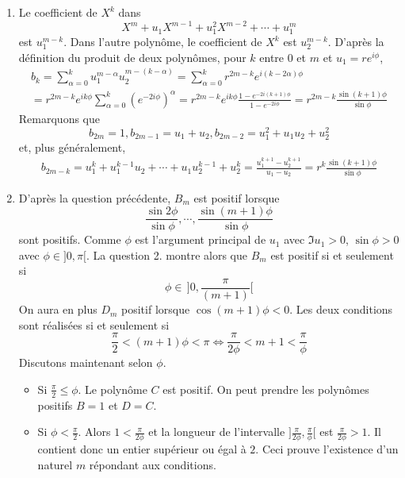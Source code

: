 \begin{enumerate}
\begin{enumerate}
\item Le coefficient de $X^k$ dans
\begin{displaymath}
X^m+u_1X^{m-1}+u_1^2X^{m-2}+\cdots+u_1^m
\end{displaymath}
est $u_1^{m-k}$. Dans l'autre polyn{\^o}me, le coefficient de $X^k$ est $u_2^{m-k}$. D'apr{\`e}s la d{\'e}finition du produit de deux polyn{\^o}mes, pour $k$ entre 0 et $m$ et $u_1=re^{i\phi}$,
\begin{multline*}
b_k = \sum_{\alpha=0}^{k}u_1^{m-\alpha}u_2^{m-(k-\alpha)}
  = \sum_{\alpha=0}^{k}r^{2m-k} e^{i(k-2\alpha)\phi}\\
  = r^{2m-k}e^{ik\phi}\sum_{\alpha=0}^{k}(e^{-2i\phi})^\alpha
  = r^{2m-k}e^{ik\phi}\frac{1-e^{-2i(k+1)\phi}}{1-e^{-2i\phi}}
  = r^{2m-k}\frac{\sin(k+1)\phi}{\sin\phi}
\end{multline*}
Remarquons que
\begin{displaymath}
b_{2m}=1,b_{2m-1}=u_1+u_2,b_{2m-2}=u_1^2+u_1u_2+u_2^2
\end{displaymath}
et, plus g{\'e}n{\'e}ralement,
\begin{multline*}
b_{2m-k} = u_1^k+u_1^{k-1}u_2+ \cdots +u_1u_2^{k-1}+u_2^k = \frac{u_1^{k+1}-u_2^{k+1}}{u_1-u_2} 
         = r^k\frac{\sin(k+1)\phi}{\sin\phi}
\end{multline*}

\item D'apr{\`e}s la question pr{\'e}c{\'e}dente, $B_m$ est positif lorsque
\begin{displaymath}
\frac{\sin2\phi}{\sin \phi},\cdots ,\frac{\sin(m+1)\phi}{\sin \phi} 
\end{displaymath}
sont positifs. Comme $\phi$ est l'argument principal de $u_1$ avec $\Im u_1 >0$, $\sin \phi>0$ avec $\phi\in ]0,\pi[$. La question 2. montre alors que $B_m$ est positif si et seulement si
\begin{displaymath}
\phi \in \, ]0,\frac{\pi}{(m+1)}[
\end{displaymath}
On aura en plus $D_m$ positif lorsque $\cos(m+1)\phi <0$. Les deux conditions sont réalisées si et seulement si
\begin{displaymath}
 \frac{\pi}{2} < (m+1)\phi < \pi \Leftrightarrow \frac{\pi}{2\phi} < m+1 < \frac{\pi}{\phi}  
\end{displaymath}
Discutons maintenant selon $\phi$.
\begin{itemize}
 \item Si $\frac{\pi}{2} \leq \phi$. Le polynôme $C$ est positif. On peut prendre les polynômes positifs  $B=1$ et $D=C$.
 \item Si $\phi < \frac{\pi}{2}$. Alors $1<\frac{\pi}{2\phi}$ et la longueur de l'intervalle $]\frac{\pi}{2\phi}, \frac{\pi}{\phi}[$ est $\frac{\pi}{2\phi}>1$. Il contient donc un entier supérieur ou égal à $2$. Ceci prouve l'existence d'un naturel $m$ répondant aux conditions.
\end{itemize}
\end{enumerate}


\end{enumerate}
